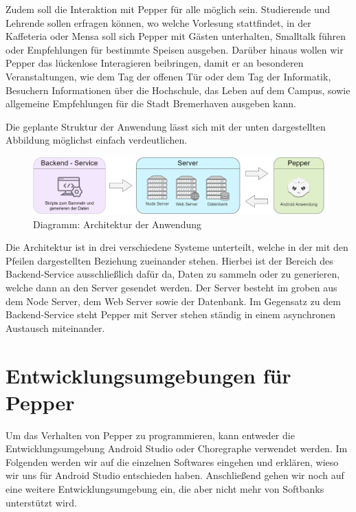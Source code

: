 Zudem soll die Interaktion mit Pepper für alle möglich sein. Studierende und Lehrende sollen erfragen können,
wo welche Vorlesung stattfindet, in der Kaffeteria oder Mensa soll sich Pepper mit Gästen unterhalten, Smalltalk führen oder
Empfehlungen für bestimmte Speisen ausgeben. Darüber hinaus wollen wir Pepper das lückenlose Interagieren beibringen, damit er an
besonderen Veranstaltungen, wie dem Tag der offenen Tür oder dem Tag der Informatik, Besuchern Informationen über die Hochschule,
das Leben auf dem Campus, sowie allgemeine Empfehlungen für die Stadt Bremerhaven ausgeben kann.

Die geplante Struktur der Anwendung lässt sich mit der unten dargestellten Abbildung möglichst einfach verdeutlichen.\\

\begin{figure}[H]
    \includegraphics[width=\textwidth]{Figures/anwendungarchitektur.png}
    \caption{Diagramm: Architektur der Anwendung}
    \label{fig:integration}
    \centering
\end{figure}

Die Architektur ist in drei verschiedene Systeme unterteilt, welche in der mit den Pfeilen dargestellten Beziehung zueinander stehen. Hierbei ist der Bereich des Backend-Service ausschließlich dafür da, Daten zu sammeln oder zu generieren, welche dann an den Server gesendet werden. Der Server besteht im groben aus dem Node Server, dem Web Server sowie der Datenbank. Im Gegensatz zu dem Backend-Service steht Pepper mit Server stehen ständig in einem asynchronen Austausch miteinander.\\

\section{Entwicklungsumgebungen für Pepper}

Um das Verhalten von Pepper zu programmieren, kann entweder die Entwicklungsumgebung Android Studio oder Choregraphe verwendet werden. Im Folgenden werden wir auf die einzelnen Softwares eingehen und erklären, wieso wir uns für Android Studio entschieden haben. Anschließend gehen wir noch auf eine weitere Entwicklungsumgebung ein, die aber nicht mehr von Softbanks unterstützt wird.\\

